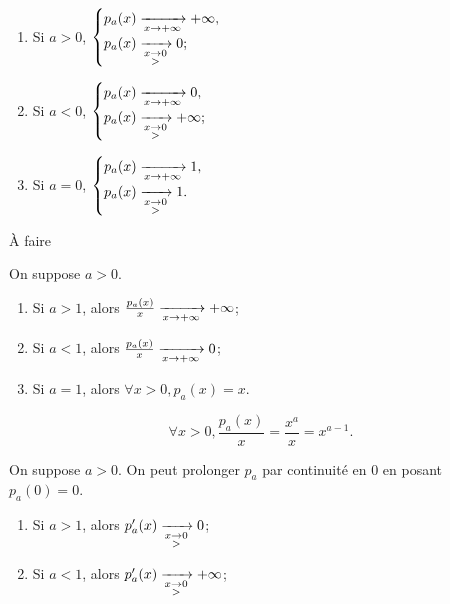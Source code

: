 \begin{prop}
	\begin{enumerate}
		\item Si $a > 0$, $\begin{cases}
			p_a(x) \xrightarrow[x\to +\infty]{} +\infty,\\
			p_a(x) \xrightarrow[\substack{x\to 0\\>}]{} 0;\\
		\end{cases}$
	\item Si $a < 0$, $\begin{cases}
			p_a(x) \xrightarrow[x\to +\infty]{} 0,\\
			p_a(x) \xrightarrow[\substack{x\to 0\\>}]{} +\infty;\\
		\end{cases}$
	\item Si $a = 0$, $\begin{cases}
			p_a(x) \xrightarrow[x\to +\infty]{} 1,\\
			p_a(x) \xrightarrow[\substack{x\to 0\\>}]{} 1.\\
		\end{cases}$
	\end{enumerate}
\end{prop}

\begin{prv}
	À faire
\end{prv}

\begin{prop}
	On suppose $a > 0$.
	\begin{enumerate}
		\item Si $a > 1$, alors $\frac{p_a(x)}{x}\xrightarrow[x\to +\infty]{} +\infty$;
		\item Si $a < 1$, alors $\frac{p_a(x)}{x} \xrightarrow[x\to +\infty]{} 0$;
		\item Si $a = 1$, alors $\forall x > 0, p_a(x) = x$.
	\end{enumerate}
\end{prop}

\begin{prv}
	\[
		\forall x > 0, \frac{p_a(x)}{x} = \frac{x^a}{x} = x^{a-1}.
	\] 
\end{prv}

\begin{prop}
	On suppose $a > 0$. On peut prolonger $p_a$ par continuité en $0$ en posant $p_a(0) = 0$.

	\begin{enumerate}
		\item Si $a > 1$, alors $p_a'(x) \xrightarrow[\substack{x\to 0\\ >}]{} 0$;
		\item Si $a < 1$, alors $p_a'(x) \xrightarrow[\substack{x\to 0\\ >}]{} +\infty$;
	\end{enumerate}
\end{prop}

